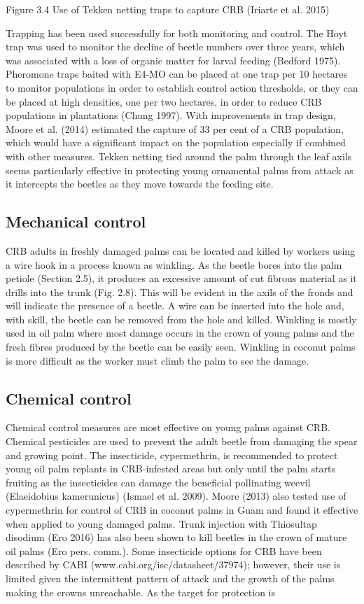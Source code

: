 \documentclass[twocolumn,letterpaper]{scrartcl}
\begin{document}
Figure 3.4  Use of Tekken netting traps to capture CRB (Iriarte et al. 2015)

Trapping has been used successfully for both monitoring and control. The Hoyt trap was used to monitor the 
decline of beetle numbers over three years, which was associated with a loss of organic matter for larval feeding 
(Bedford 1975). Pheromone traps baited with E4-MO can be placed at one trap per 10 hectares to monitor 
populations in order to establish control action thresholds, or they can be placed at high densities, one per two 
hectares, in order to reduce CRB populations in plantations (Chung 1997). With improvements in trap design, 
Moore et al. (2014) estimated the capture of 33 per cent of a CRB population, which would have a significant 
impact on the population especially if combined with other measures. Tekken netting tied around the palm 
through  the  leaf  axils  seems  particularly  effective  in  protecting  young  ornamental  palms  from  attack  as  it 
intercepts the beetles as they move towards the feeding site. 

\subsection{Mechanical control}
CRB adults in freshly damaged palms can be located and killed by workers using a wire hook in a process known 
as winkling. As the beetle bores into the palm petiole (Section 2.5), it produces an excessive amount of cut 
fibrous material as it drills into the trunk (Fig. 2.8). This will be evident in the axils of the fronds and will indicate 
the presence of a beetle. A wire can be inserted into the hole and, with skill, the beetle can be removed from 
the hole and killed. Winkling is mostly used in oil palm where most damage occurs in the crown of young palms 
and the fresh fibres produced by the beetle can be easily seen. Winkling in coconut palms is more difficult as 
the worker must climb the palm to see the damage. 

\subsection{Chemical control}
Chemical  control  measures  are  most  effective  on  young  palms  against  CRB.  Chemical  pesticides  are  used 
to  prevent  the  adult  beetle  from  damaging  the  spear  and  growing  point.  The  insecticide,  cypermethrin,  is 
recommended to protect young oil palm replants in CRB-infested areas but only until the palm starts fruiting 
as the insecticides can damage the beneficial pollinating weevil (Elaeidobius kamerunicus) (Ismael et al. 2009). 
Moore (2013) also tested use of cypermethrin for control of CRB in coconut palms in Guam and found it effective 
when applied to young damaged palms. Trunk injection with Thiosultap disodium (Ero 2016) has also been 
shown to kill beetles in the crown of mature oil palms (Ero pers. comm.). Some insecticide options for CRB have 
been described by CABI (www.cabi.org/isc/datasheet/37974); however, their use is limited given the intermittent 
pattern of attack and the growth of the palms making the crowns unreachable. As the target for protection is 
\end{document}
